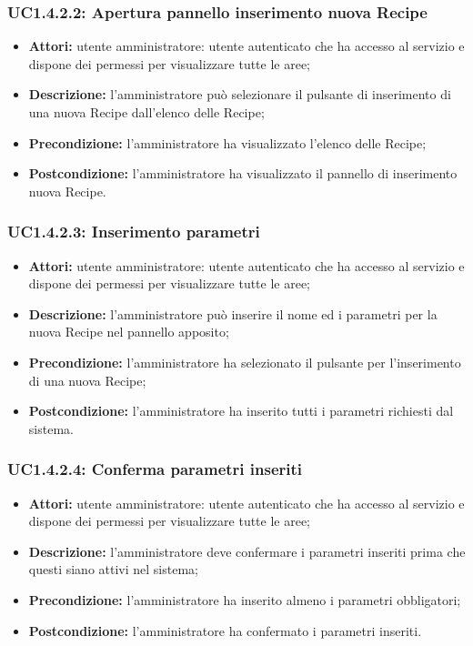 \subsubsection{UC1.4.2.2: Apertura pannello inserimento nuova Recipe}

\begin{itemize}
   	\item \textbf{Attori:} utente amministratore: utente autenticato che ha accesso al servizio e dispone dei permessi per visualizzare tutte le aree;
    \item \textbf{Descrizione:} l'amministratore può selezionare il pulsante di inserimento di una nuova Recipe\gloss{} dall'elenco delle Recipe;
    \item \textbf{Precondizione:} l'amministratore ha visualizzato l'elenco delle Recipe\gloss{};
    \item \textbf{Postcondizione:} l'amministratore ha visualizzato il pannello di inserimento nuova Recipe\gloss{}.
\end{itemize}

\subsubsection{UC1.4.2.3: Inserimento parametri}

\begin{itemize}
   	\item \textbf{Attori:} utente amministratore: utente autenticato che ha accesso al servizio e dispone dei permessi per visualizzare tutte le aree;
    \item \textbf{Descrizione:} l'amministratore può inserire il nome ed i parametri per la nuova Recipe\gloss{} nel pannello apposito;
    \item \textbf{Precondizione:} l'amministratore ha selezionato il pulsante per l'inserimento di una nuova Recipe\gloss{};
    \item \textbf{Postcondizione:} l'amministratore ha inserito tutti i parametri richiesti dal sistema.
\end{itemize}

\subsubsection{UC1.4.2.4: Conferma parametri inseriti}

\begin{itemize}
  	\item \textbf{Attori:} utente amministratore: utente autenticato che ha accesso al servizio e dispone dei permessi per visualizzare tutte le aree;
    \item \textbf{Descrizione:} l'amministratore deve confermare i parametri inseriti prima che questi siano attivi nel sistema;
    \item \textbf{Precondizione:} l'amministratore ha inserito almeno i parametri obbligatori;
    \item \textbf{Postcondizione:} l'amministratore ha confermato i parametri inseriti.
\end{itemize}

